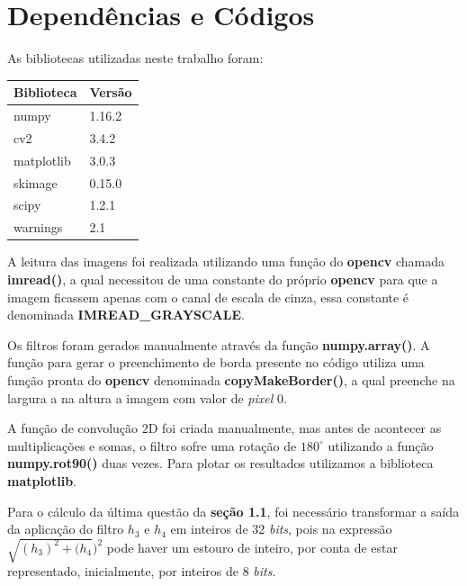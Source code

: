 \documentclass[twoside,twocolumn]{article}
\begin{document}

\section{Dependências e Códigos}

As bibliotecas utilizadas neste trabalho foram:

\begin{table}[H]
\begin{tabular}{|l|l|}
\hline
\textbf{Biblioteca} & \textbf{Versão} \\ \hline
numpy               & 1.16.2          \\ \hline
cv2                 & 3.4.2           \\ \hline
matplotlib          & 3.0.3           \\ \hline
skimage             & 0.15.0          \\ \hline
scipy               & 1.2.1           \\ \hline
warnings            & 2.1             \\ \hline
\end{tabular}
\end{table}

A leitura das imagens foi realizada utilizando uma função do \textbf{opencv} \cite{b1} chamada \textbf{imread()}, a qual necessitou de uma constante do próprio \textbf{opencv} para que a imagem ficassem apenas com o canal de escala de cinza, essa constante é denominada \textbf{IMREAD\_GRAYSCALE}.

Os filtros foram gerados manualmente através da função \textbf{numpy.array()}. A função para gerar o preenchimento de borda presente no código utiliza uma função pronta do \textbf{opencv} denominada \textbf{copyMakeBorder()}, a qual preenche na largura a na altura a imagem com valor de \textit{pixel} 0.

A função de convolução 2D foi criada manualmente, mas antes de acontecer as multiplicações e somas, o filtro sofre uma rotação de $180^{\circ}$ utilizando a função \textbf{numpy.rot90()} duas vezes. Para plotar os resultados utilizamos a biblioteca \textbf{matplotlib}.

Para o cálculo da última questão da \textbf{seção 1.1}, foi necessário transformar a saída da aplicação do filtro $h_{3}$ e $h_{4}$ em inteiros de 32 \textit{bits}, pois na expressão $\sqrt{(h_{3})^{2} + (h_{4}})^{2}$ pode haver um estouro de inteiro, por conta de estar representado, inicialmente, por inteiros de 8 \textit{bits}.
\end{document}
